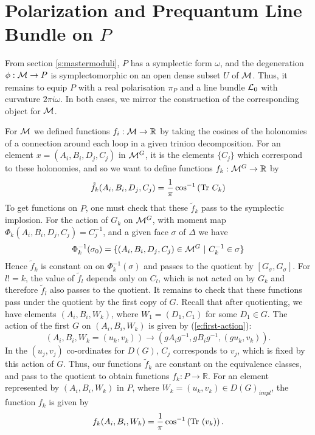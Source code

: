 \section{Polarization and Prequantum Line Bundle on $P$}
	From section \ref{s:mastermoduli}, $P$ has a symplectic form $\omega$, and the degeneration $\phi:\mathcal{M}\to P$ is symplectomorphic on an open dense subset $U$ of $\mathcal{M}$. Thus, it remains to equip $P$ with a real polarisation $\pi_P$ and a line bundle $\mathcal{L}_0$ with curvature $2\pi i \omega$. In both cases, we mirror the construction of the corresponding object for $\mathcal{M}$.
	
	For $\mathcal{M}$ we defined functions $f_i:\mathcal{M}\to \mathbb{R}$ by taking the cosines of the holonomies of a connection around each loop in a given trinion decomposition. For an element $x=(A_i,B_i,D_j,C_j)$ in $\mathcal{M}^G$, it is the elements $\{C_j\}$ which correspond to these holonomies, and so we want to define functions $f_k:\mathcal{M}^G \to \mathbb{R}$ by 
	\begin{equation}
		\tilde{f}_k(A_i,B_i,D_j,C_j) = \frac{1}{\pi}\cos^{-1} \left(\text{Tr } C_k\right)
	\end{equation}
	To get functions on $P$, one must check that these $\tilde{f}_k$ pass to the symplectic implosion. For the action of $G_k$ on $\mathcal{M}^G$, with moment map $\Phi_k(A_i,B_i,D_j,C_j) = C_j^{-1}$, and a given face $\sigma$ of $\Delta$ we have
	\begin{equation}
		\Phi_k^{-1}(\sigma_0) = \{
		(A_i,B_i,D_j,C_j) \in \mathcal{M}^G ~|~ C_k^{-1} \in \sigma
		\}
	\end{equation}
	Hence $\tilde{f}_k$ is constant on on $\Phi_k^{-1}(\sigma)$ and passes to the quotient by $[G_\sigma,G_\sigma]$. For $l != k$, the value of $\tilde{f}_l$ depends only on $C_l$, which is not acted on by $G_k$ and therefore $\tilde{f}_l$ also passes to the quotient. It remains to check that these functions pass under the quotient by the first copy of $G$. Recall that after quotienting, we have elements $(A_i,B_i,W_k)$, where $W_1=(D_1,C_1)$ for some $D_1 \in G$. The action of the first $G$ on $(A_i,B_i,W_k)$ is given by (\ref{e:first-action}):
	\begin{equation}
		\left(A_i,B_i,W_k = (u_k,v_k)\right) \to (gA_ig^{-1}, gB_ig^{-1}, (gu_k, v_k)).
	\end{equation}
	In the $(u_j,v_j)$ co-ordinates for $D(G)$, $C_j$ corresponds to $v_j$, which is fixed by this action of $G$. Thus, our functions $\tilde{f}_k$ are constant on the equivalence classes, and pass to the quotient to obtain functions $f_k:P\to \mathbb{R}$. For an element represented by $(A_i,B_i,W_k)$ in $P$, where $W_k = (u_k,v_k) \in D(G)_{impl}$, the function $f_k$ is given by
	\begin{equation}
		f_k(A_i,B_i,W_k) = \frac{1}{\pi}\cos^{-1}\left(\text{Tr }(v_k)\right).
 	\end{equation}
	
